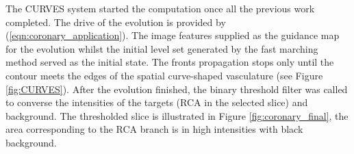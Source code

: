 The CURVES system started the computation once all the previous work completed.
The drive of the evolution is provided by (\ref{eqn:coronary_application}).
The image features supplied as the guidance map for the evolution whilst the initial level set generated by the fast marching method served as the initial state.
The fronts propagation stops only until the contour meets the edges of the spatial curve-shaped vasculature (see Figure \ref{fig:CURVES}).
After the evolution finished, the binary threshold filter was called to converse the intensities of the targets (RCA in the selected slice) and background.
The thresholded slice is illustrated in Figure \ref{fig:coronary_final}, the area corresponding to the RCA branch is in high intensities with black background.
\begin{figure}[!tb]
\centering
{}
\hfil
{}
\hfil
{}
\end{figure}
